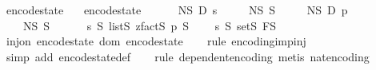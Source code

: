 \begin{isabellebody}
\isanewline
{}\isamarkupfalse%
\ encode{\isacharunderscore}{\kern0pt}state\ \isanewline
\ \ {\isachardoublequoteopen}encode{\isacharunderscore}{\kern0pt}state\ {\isacharequal}{\kern0pt}\ \isanewline
\ \ \ \ N\isactrlsub S\ {\isasymtimes}\isactrlsub D\ {\isacharparenleft}{\kern0pt}{\isasymlambda}s{\isachardot}{\kern0pt}\ \isanewline
\ \ \ \ N\isactrlsub S\ {\isasymtimes}\isactrlsub S\ {\isacharparenleft}{\kern0pt}\isanewline
\ \ \ \ N\isactrlsub S\ {\isasymtimes}\isactrlsub D\ {\isacharparenleft}{\kern0pt}{\isasymlambda}p{\isachardot}{\kern0pt}\ \isanewline
\ \ \ \ N\isactrlsub S\ {\isasymtimes}\isactrlsub S\ {\isacharparenleft}{\kern0pt}\ \isanewline
\ \ \ \ {\isacharparenleft}{\kern0pt}{\isacharbrackleft}{\kern0pt}{}{\isachardot}{\kern0pt}{\isachardot}{\kern0pt}{\isacharless}{\kern0pt}s{\isacharbrackright}{\kern0pt}\ {\isasymrightarrow}\isactrlsub S\ {\isacharparenleft}{\kern0pt}list\isactrlsub S\ {\isacharparenleft}{\kern0pt}zfact\isactrlsub S\ p{\isacharparenright}{\kern0pt}{\isacharparenright}{\kern0pt}{\isacharparenright}{\kern0pt}\ {\isasymtimes}\isactrlsub S\isanewline
\ \ \ \ {\isacharparenleft}{\kern0pt}{\isacharbrackleft}{\kern0pt}{}{\isachardot}{\kern0pt}{\isachardot}{\kern0pt}{\isacharless}{\kern0pt}s{\isacharbrackright}{\kern0pt}\ {\isasymrightarrow}\isactrlsub S\ {\isacharparenleft}{\kern0pt}set\isactrlsub S\ F\isactrlsub S{\isacharparenright}{\kern0pt}{\isacharparenright}{\kern0pt}{\isacharparenright}{\kern0pt}{\isacharparenright}{\kern0pt}{\isacharparenright}{\kern0pt}{\isacharparenright}{\kern0pt}{\isachardoublequoteclose}\isanewline
\isanewline
{}\isamarkupfalse%
\ {\isachardoublequoteopen}inj{\isacharunderscore}{\kern0pt}on\ encode{\isacharunderscore}{\kern0pt}state\ {\isacharparenleft}{\kern0pt}dom\ encode{\isacharunderscore}{\kern0pt}state{\isacharparenright}{\kern0pt}{\isachardoublequoteclose}\isanewline
%
\isadelimproof
\ \ %
\endisadelimproof
%
\isatagproof
{}\isamarkupfalse%
\ {\isacharparenleft}{\kern0pt}rule\ encoding{\isacharunderscore}{\kern0pt}imp{\isacharunderscore}{\kern0pt}inj{\isacharparenright}{\kern0pt}\isanewline
\ \ \isamarkupfalse%
\ {\isacharparenleft}{\kern0pt}simp\ add{\isacharcolon}{\kern0pt}\ encode{\isacharunderscore}{\kern0pt}state{\isacharunderscore}{\kern0pt}def{\isacharparenright}{\kern0pt}\isanewline
\ \ \isamarkupfalse%
\ {\isacharparenleft}{\kern0pt}rule\ dependent{\isacharunderscore}{\kern0pt}encoding{\isacharcomma}{\kern0pt}\ metis\ nat{\isacharunderscore}{\kern0pt}encoding{\isacharparenright}{\kern0pt}\isanewline

\end{isabellebody}
